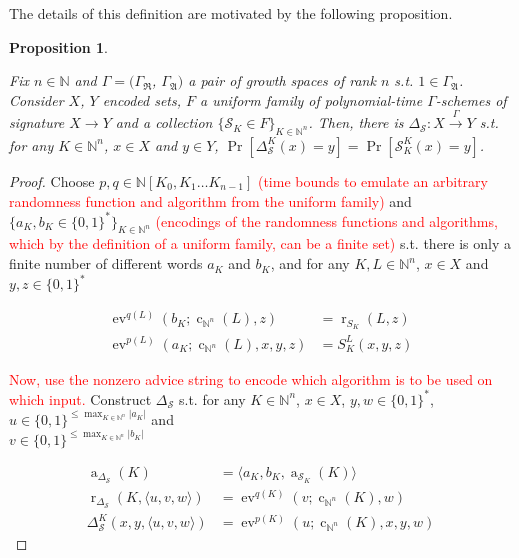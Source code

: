 \documentclass[11pt]{article}
\numberwithin{equation}{section}
\theoremstyle{definition}
\theoremstyle{plain}
\newtheorem{proposition}{Proposition}[section]
\newcommand{\Bool}{\{0,1\}}
\newcommand{\Words}{{\Bool^*}}
\DeclareMathOperator{\Ev}{ev}
\DeclareMathOperator{\R}{r}
\DeclareMathOperator{\A}{a}
\DeclareMathOperator{\En}{c}
\newcommand{\Nats}{\mathbb{N}}
\newcommand{\NatPoly}{\Nats[K_0, K_1 \ldots K_{n-1}]}
\newcommand{\Abs}[1]{\lvert #1 \rvert}
\newcommand{\Chev}[1]{\langle #1 \rangle}
\newcommand{\GrowR}{\Gamma_{\mathfrak{R}}}
\newcommand{\GrowA}{\Gamma_{\mathfrak{A}}}
\begin{document}
The details of this definition are motivated by the following proposition.

\begin{proposition}
\label{prp:fam_diag}

Fix $n \in \Nats$ and $\Gamma=(\GrowR$, $\GrowA)$ a pair of growth spaces of rank $n$ s.t. $1 \in \GrowA$. Consider $X$, $Y$ encoded sets, $F$ a uniform family of polynomial-time $\Gamma$-schemes of signature $X \rightarrow Y$ and a collection ${\{\mathcal{S}_K \in F\}_{K \in \Nats^n}}$. Then, there is $\Delta_\mathcal{S}: X \xrightarrow{
\Gamma} Y$ s.t. for any $K \in \Nats^n$, $x \in X$ and $y \in Y$, ${\Pr[\Delta_\mathcal{S}^K(x)=y] = \Pr[\mathcal{S}_K^K(x)=y]}$.

\end{proposition}

\begin{proof}

Choose ${p,q \in \NatPoly}$ \textcolor{red}{(time bounds to emulate an arbitrary randomness function and algorithm from the uniform family)} and ${\{a_K, b_K \in \Words\}}_{K \in \Nats^n}$ 
\textcolor{red}{(encodings of the randomness functions and algorithms, which by the definition of a uniform family, can be a finite set)} s.t. there is only a finite number of different words $a_K$ and $b_K$, and for any ${K,L \in \Nats^n}$, ${x \in X}$ and ${y,z \in \Words}$

\begin{align*}
\Ev^{q(L)}(b_K;\En_{\Nats^n}(L),z) &= \R_{S_K}(L,z) \\
\Ev^{p(L)}(a_K;\En_{\Nats^n}(L),x,y,z) &= S_K^L(x,y,z) 
\end{align*}

\textcolor{red}{Now, use the nonzero advice string to encode which algorithm is to be used on which input.} Construct ${\Delta_{\mathcal{S}}}$ s.t. for any ${K \in \Nats^n}$, ${x \in X}$, ${y, w \in \Words}$, ${u \in \Bool^{\leq \max_{K \in \Nats^n} \Abs{a_K}}}$ and\\ ${v \in \Bool^{\leq \max_{K \in \Nats^n} \Abs{b_K}}}$

\begin{align*}
\A_{\Delta_{\mathcal{S}}}(K)&=\Chev{a_K,b_K,\A_{\mathcal{S}_K}(K)} \\
\R_{\Delta_{\mathcal{S}}}(K,\Chev{u,v,w})&=\Ev^{q(K)}(v;\En_{\Nats^n}(K),w) \\
\Delta_{\mathcal{S}}^K(x,y,\Chev{u,v,w})&=\Ev^{p(K)}(u;\En_{\Nats^n}(K),x,y,w)
\end{align*}
%
\end{proof}
\end{document}
